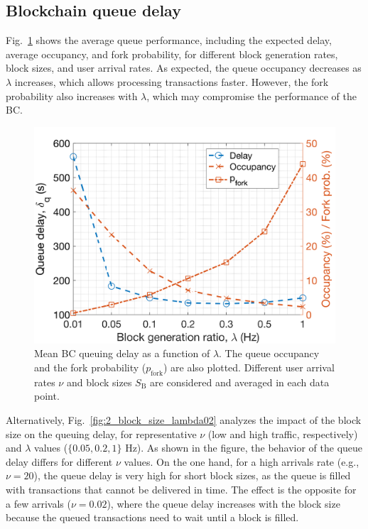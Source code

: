 \documentclass[10pt,journal,compsoc]{IEEEtran}
\begin{document}

\subsection{Blockchain queue delay}

Fig.~\ref{fig:bc_delay_mu} shows the average queue performance, including the expected delay, average occupancy, and fork probability, for different block generation rates, block sizes, and user arrival rates. As expected, the queue occupancy decreases as $\lambda$ increases, which allows processing transactions faster. However, the fork probability also increases with $\lambda$, which may compromise the performance of the BC. %

\begin{figure}[ht!]
	\centering
	\includegraphics[width=.75\linewidth]{img/1_mean_occupancy_delay_2.png}
	\caption{Mean BC queuing delay as a function of $\lambda$. The queue occupancy and the fork probability ($p_\text{fork}$) are also plotted. Different user arrival rates $\nu$ and block sizes $S_\text{B}$ are considered and averaged in each data point.}
	\label{fig:bc_delay_mu}
\end{figure}

Alternatively, Fig.~\ref{fig:2_block_size_lambda02} analyzes the impact of the block size on the queuing delay, for representative $\nu$ (low and high traffic, respectively) and $\lambda$ values ($\{0.05, 0.2, 1\}$ Hz). As shown in the figure, the behavior of the queue delay differs for different $\nu$ values. On the one hand, for a high arrivals rate (e.g., $\nu = 20$), the queue delay is very high for short block sizes, as the queue is filled with transactions that cannot be delivered in time. The effect is the opposite for a few arrivals ($\nu = 0.02$), where the queue delay increases with the block size because the queued transactions need to wait until a block is filled.
\end{document}
